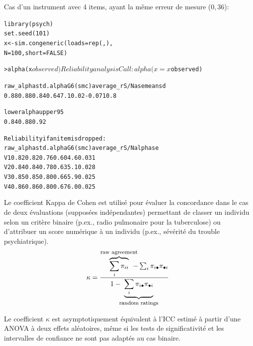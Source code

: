 
Cas d'un instrument avec 4 items, ayant la même erreur de mesure ($0,36$):
\begin{alltt}
library(psych)
set.seed(101)
\textcolor{Apricot}{x} <- sim.congeneric(loads = rep(, ), \hfill{} 
                    N = 100, short = FALSE)
\end{alltt}


\begin{alltt}\small
> alpha(x$observed)

Reliability analysis
Call: alpha(x = x$observed)

  raw_alpha std.alpha G6(smc) average_r S/N  ase   mean  sd
      0.88      0.88    0.84      0.64 7.1 0.02 -0.071 0.8

 lower alpha upper     95%
0.84 0.88 0.92

 Reliability if an item is dropped:
   raw_alpha std.alpha G6(smc) average_r S/N alpha se
V1      0.82      0.82    0.76      0.60 4.6    0.031
V2      0.84      0.84    0.78      0.63 5.1    0.028
V3      0.85      0.85    0.80      0.66 5.9    0.025
V4      0.86      0.86    0.80      0.67 6.0    0.025
\end{alltt}


Le coefficient Kappa de Cohen est utilisé pour évaluer la concordance dans le
cas de deux évaluations (supposées indépendantes) permettant de classer un
individu selon un critère binaire\autocite{cohen60} (p.ex., radio pulmonaire
pour la tuberculose) ou d'attribuer un score numérique à un
individu\autocite{cohen68} (p.ex., sévérité du trouble psychiatrique).
\begin{equation}
  \kappa=\frac{\overbrace{\sum_i\pi_{ii}}^{\textrm{\footnotesize raw agreement}}\hskip-2ex-\sum_i\pi_{i\bullet}\pi_{\bullet
      i}}{1-\hskip-1ex\underbrace{\sum_i\pi_{i\bullet}\pi_{\bullet i}}_{\textrm{\footnotesize random ratings}}}
\end{equation}


\foilhead{}
Le coefficient $\kappa$ est asymptotiquement équivalent à l'ICC estimé à partir
d'une ANOVA à deux effets aléatoires, même si les tests de significativité et
les intervalles de confiance ne sont pas adaptés au cas binaire. 

